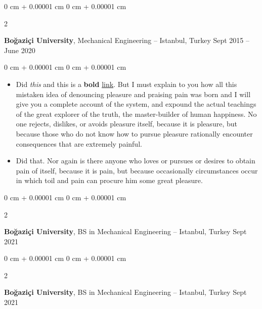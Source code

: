 \documentclass[10pt, letterpaper]{article}
\newenvironment{highlights}{
    \begin{itemize}[
        topsep=0.10 cm,
        parsep=0.10 cm,
        partopsep=0pt,
        itemsep=0pt,
        leftmargin=0 cm + 10pt
    ]
}{
    \end{itemize}
} %
\newenvironment{onecolentry}{
    \begin{adjustwidth}{
        0 cm + 0.00001 cm
    }{
        0 cm + 0.00001 cm
    }
}{
    \end{adjustwidth}
} %
\newenvironment{twocolentry}[2][]{
    \onecolentry
    \def\secondColumn{#2}
    \setcolumnwidth{\fill, 4.5 cm}
    \begin{paracol}{2}
}{
    \switchcolumn \raggedleft \secondColumn
    \end{paracol}
    \endonecolentry
} %
\begin{document}
        \vspace{0.2 cm}

        \begin{twocolentry}{
            Sept 2015 – June 2020
        }
            \textbf{Boğaziçi University}, Mechanical Engineering -- Istanbul, Turkey\end{twocolentry}

        \vspace{0.10 cm}
        \begin{onecolentry}
            \begin{highlights}
                \item Did \textit{this} and this is a \textbf{bold} \href{https://example.com}{link}. But I must explain to you how all this mistaken idea of denouncing pleasure and praising pain was born and I will give you a complete account of the system, and expound the actual teachings of the great explorer of the truth, the master-builder of human happiness. No one rejects, dislikes, or avoids pleasure itself, because it is pleasure, but because those who do not know how to pursue pleasure rationally encounter consequences that are extremely painful.
                \item Did that. Nor again is there anyone who loves or pursues or desires to obtain pain of itself, because it is pain, but because occasionally circumstances occur in which toil and pain can procure him some great pleasure.
            \end{highlights}
        \end{onecolentry}


        \vspace{0.2 cm}

        \begin{twocolentry}{
            Sept 2021
        }
            \textbf{Boğaziçi University}, BS in Mechanical Engineering -- Istanbul, Turkey\end{twocolentry}



        \vspace{0.2 cm}

        \begin{twocolentry}{
            Sept 2021
        }
            \textbf{Boğaziçi University}, BS in Mechanical Engineering -- Istanbul, Turkey\end{twocolentry}
\end{document}
